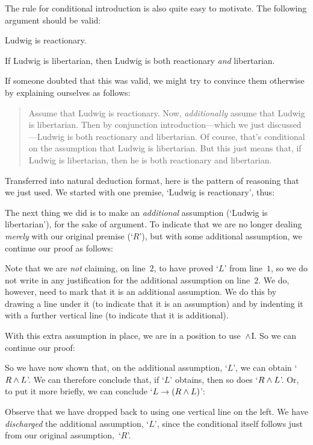 The rule for conditional introduction is also quite easy to motivate. The following argument should be valid:
	\begin{earg}
		\item Ludwig is reactionary. 
		\item[\texttherefore] If Ludwig is libertarian, then Ludwig is both reactionary \emph{and} libertarian.
	\end{earg}
If someone doubted that this was valid, we might try to convince them otherwise by explaining ourselves as follows:
	\begin{quote}
		Assume that Ludwig is reactionary. Now, \emph{additionally} assume that Ludwig is libertarian. Then by conjunction introduction---which we just discussed---Ludwig is both reactionary and libertarian. Of course, that's conditional on the assumption that Ludwig is libertarian. But this just means that, if Ludwig is libertarian, then he is both reactionary and libertarian.
	\end{quote}
Transferred into natural deduction format, here is the pattern of reasoning that we just used. We started with one premise, `Ludwig is reactionary', thus:
	\begin{fitchproof}
		\PR
	\end{fitchproof}
The next thing we did is to make an \emph{additional} assumption (`Ludwig is libertarian'), for the sake of argument. To indicate that we are no longer dealing \emph{merely} with our original premise (`$R$'), but with some additional assumption, we continue our proof as follows:
	\begin{fitchproof}
		\hypo{r}{R}\PR
		\open
			\hypo{l}{L}\AS
	\end{fitchproof}
Note that we are \emph{not} claiming, on line~$2$, to have proved
`$L$' from line~$1$, so we do not write in any justification for the
additional assumption on line~$2$. We do, however, need to mark that
it is an additional assumption. We do this by drawing a line under it
(to indicate that it is an assumption) and by indenting it with a
further vertical line (to indicate that it is additional).

With this extra assumption in place, we are in a position to
use~$\wedge$I. So we can continue our proof:
	\begin{fitchproof}
		\PR
		\open
			\AS
			\ai{r, l}
	\end{fitchproof}
So we have now shown that, on the additional assumption, `$L$', we can obtain `$R \wedge L$'. We can therefore conclude that, if `$L$' obtains, then so does `$R \wedge L$'. Or, to put it more briefly, we can conclude `$L \rightarrow (R \wedge L)$':
	\begin{fitchproof}
		\hypo{r}{R}\PR
		\open
			\hypo{l}{L}\AS
			\ai{r, l}
			\close
		\ci{l-rl}
	\end{fitchproof}
Observe that we have dropped back to using one vertical line on the left.  We have \emph{discharged} the additional assumption, `$L$', since the conditional itself follows just from our original assumption,~`$R$'.

